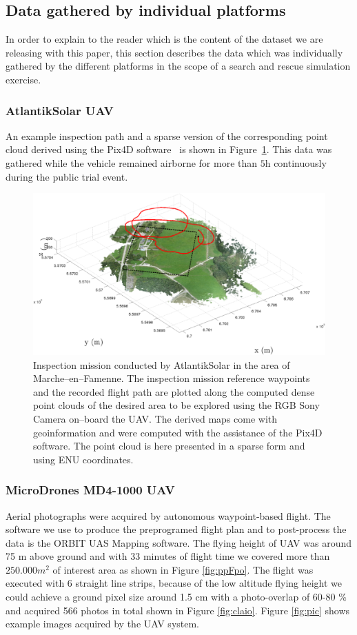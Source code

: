 \documentclass{article}
\begin{document}
\subsection{Data gathered by individual platforms}
In order to explain to the reader which is the content of the dataset we are releasing with this paper, this section describes the data which was individually gathered by the different platforms in the scope of a search and rescue simulation exercise.
\subsubsection{AtlantikSolar UAV}
An example inspection path and a sparse version of the corresponding point cloud derived using the Pix4D software~\cite{Pix4Dsite} is shown in Figure~\ref{fig:AtlantikSolar_Inspection}.
This data was gathered while the vehicle remained airborne for more than $5\textrm{h}$ continuously during the public trial event.


\begin{figure}
    \centering
    \includegraphics[width=\textwidth]{ROB-15-0035_fig21.eps}
    \caption{Inspection mission conducted by AtlantikSolar in the area of Marche--en--Famenne.
The inspection mission reference waypoints and the recorded flight path are plotted along the computed dense point clouds of the desired area to be explored using the RGB Sony Camera on--board the UAV.
The derived maps come with geoinformation and were computed with the assistance of the Pix4D software. The point cloud is here presented in a sparse form and using ENU coordinates.}
    \label{fig:AtlantikSolar_Inspection}
\end{figure}


\subsubsection{MicroDrones MD4-1000 UAV}
Aerial photographs were acquired by autonomous waypoint-based flight.
The software we use to produce the preprogramed flight plan and to post-process the data is the ORBIT UAS Mapping software.
The flying height of UAV was around 75 m above ground and with 33 minutes of flight time we covered more than $250.000m^2$ of interest area as shown in Figure \ref{fig:ppFpo}. The flight was executed with 6 straight line strips, because of the low altitude flying height we could achieve a ground pixel size around 1.5 cm with a photo-overlap of 60-80 \% and acquired 566 photos in total shown in Figure \ref{fig:claio}. Figure \ref{fig:pic} shows example images acquired by the UAV system.
\end{document}
